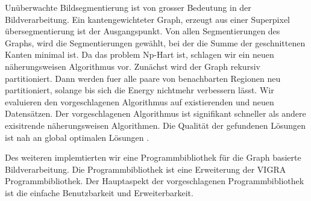 Un\"uberwachte Bildsegmentierung 
ist von grosser Bedeutung in der Bildverarbeitung.
Ein kantengewichteter Graph, erzeugt aus einer
Superpixel \"ubersegmentierung  ist der Ausgangspunkt.
Von allen Segmentierungen des Graphs, 
wird die Segmentierungen gew\"ahlt,
bei der die Summe der geschnittenen Kanten 
minimal ist.
Da das problem Np-Hart ist, schlagen wir 
ein neuen n\"aherungsweisen Algorithmus vor.
Zun\"achst wird der Graph rekursiv partitioniert.
Dann werden fuer alle paare von benachbarten
Regionen neu partitioniert, solange
bis sich die Energy nichtmehr verbessern l\"asst.
Wir evaluieren den vorgeschlagenen Algorithmus
auf existierenden und neuen Datens\"atzen.
Der vorgeschlagenen Algorithmus 
ist signifikant schneller als 
andere exisitrende  n\"aherungsweisen Algorithmen.
Die Qualit\"at der gefundenen L\"osungen 
ist nah an global optimalen L\"osungen .


Des weiteren implemtierten wir eine 
Programmbibliothek f\"ur  die Graph basierte  Bildverarbeitung.
Die Programmbibliothek ist eine Erweiterung der VIGRA Programmbibliothek.
Der Hauptaspekt der vorgeschlagenen Programmbibliothek
ist die einfache Benutzbarkeit und Erweiterbarkeit.




\endgroup           

\vfill